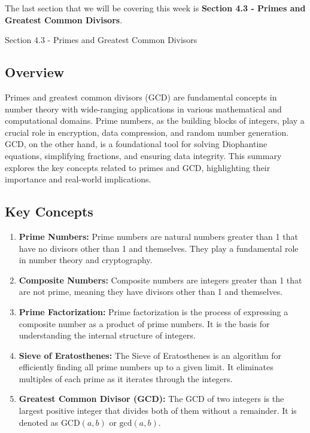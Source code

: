 The last section that we will be covering this week is \textbf{Section 4.3 - Primes and Greatest Common Divisors}.

\begin{notes}{Section 4.3 - Primes and Greatest Common Divisors}
    \subsection*{Overview}

    Primes and greatest common divisors (GCD) are fundamental concepts in number theory with wide-ranging applications in various mathematical and computational domains. Prime numbers, as the building 
    blocks of integers, play a crucial role in encryption, data compression, and random number generation. GCD, on the other hand, is a foundational tool for solving Diophantine equations, simplifying 
    fractions, and ensuring data integrity. This summary explores the key concepts related to primes and GCD, highlighting their importance and real-world implications.

    \subsection*{Key Concepts}

    \begin{enumerate}[label=\arabic*.]
        \item \textbf{Prime Numbers:} Prime numbers are natural numbers greater than 1 that have no divisors other than 1 and themselves. They play a fundamental role in number theory and cryptography.
        
        \item \textbf{Composite Numbers:} Composite numbers are integers greater than 1 that are not prime, meaning they have divisors other than 1 and themselves.
        
        \item \textbf{Prime Factorization:} Prime factorization is the process of expressing a composite number as a product of prime numbers. It is the basis for understanding the internal structure 
        of integers.
        
        \item \textbf{Sieve of Eratosthenes:} The Sieve of Eratosthenes is an algorithm for efficiently finding all prime numbers up to a given limit. It eliminates multiples of each prime as it 
        iterates through the integers.
        
        \item \textbf{Greatest Common Divisor (GCD):} The GCD of two integers is the largest positive integer that divides both of them without a remainder. It is denoted as $\text{GCD}(a, b)$ or 
        $\text{gcd}(a, b)$.
        

\end{enumerate}
\end{notes}
